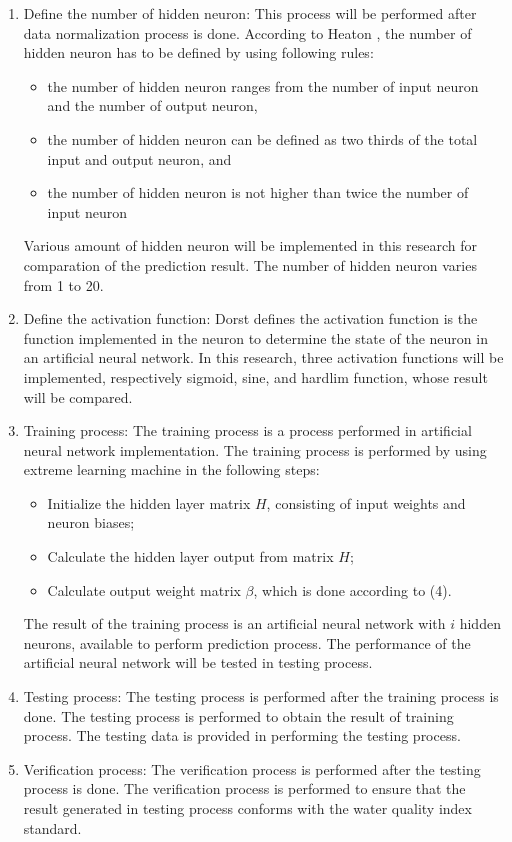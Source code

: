 \documentclass[journal,comsoc]{IEEEtran}
\begin{document}
\begin{enumerate}
\item Define the number of hidden neuron: This process will be performed after data normalization process is done. According to Heaton \cite{Heaton08} , the number of hidden neuron has to be defined by using following rules:

\begin{itemize}
\item the number of hidden neuron ranges from the number of input neuron and the number of output neuron,
\item the number of hidden neuron can be defined as two thirds of the total input and output neuron, and
\item the number of hidden neuron is not higher than twice the number of input neuron
\end{itemize}

Various amount of hidden neuron will be implemented in this research for comparation of the prediction result. The number of hidden neuron varies from 1 to 20.

\item Define the activation function: Dorst \cite{Dorst16} defines the activation function is the function implemented in the neuron to determine the state of the neuron in an artificial neural network. In this research, three activation functions will be implemented, respectively sigmoid, sine, and hardlim function, whose result will be compared.

\item Training process: The training process is a process performed in artificial neural network implementation. The training process is performed by using extreme learning machine in the following steps:

\begin{itemize}
\item Initialize the hidden layer matrix $H$, consisting of input weights and neuron biases;
\item Calculate the hidden layer output from matrix $H$;
\item Calculate output weight matrix $\beta$, which is done according to (4).
\end{itemize}

The result of the training process is an artificial neural network with $i$ hidden neurons, available to perform prediction process. The performance of the artificial neural network will be tested in testing process.

\item Testing process: The testing process is performed after the training process is done. The testing process is performed to obtain the result of training process. The testing data is provided in performing the testing process.

\item Verification process: The verification process is performed after the testing process is done. The verification process is performed to ensure that the result generated in testing process conforms with the water quality index standard.

\end{enumerate}
\end{document}
